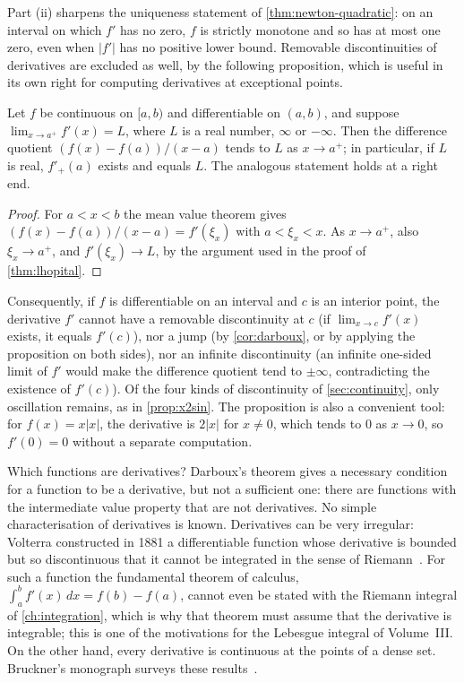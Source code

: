 Part (ii) sharpens the uniqueness statement of \cref{thm:newton-quadratic}: on an interval on which $f'$ has no zero, $f$ is strictly monotone and so has at most one zero, even when $|f'|$ has no positive lower bound. Removable discontinuities of derivatives are excluded as well, by the following proposition, which is useful in its own right for computing derivatives at exceptional points.

\begin{proposition}
\label{prop:derivative-limit}
Let $f$ be continuous on $[a,b)$ and differentiable on $(a,b)$, and suppose $\lim_{x\to a^+}f'(x)=L$, where $L$ is a real number, $\infty$ or $-\infty$. Then the difference quotient $(f(x)-f(a))/(x-a)$ tends to $L$ as $x\to a^+$; in particular, if $L$ is real, $f'_+(a)$ exists and equals $L$. The analogous statement holds at a right end.
\end{proposition}

\begin{proof}
For $a<x<b$ the mean value theorem gives $(f(x)-f(a))/(x-a)=f'(\xi_x)$ with $a<\xi_x<x$. As $x\to a^+$, also $\xi_x\to a^+$, and $f'(\xi_x)\to L$, by the argument used in the proof of \cref{thm:lhopital}.
\end{proof}

Consequently, if $f$ is differentiable on an interval and $c$ is an interior point, the derivative $f'$ cannot have a removable discontinuity at $c$ (if $\lim_{x\to c}f'(x)$ exists, it equals $f'(c)$), nor a jump (by \cref{cor:darboux}, or by applying the proposition on both sides), nor an infinite discontinuity (an infinite one-sided limit of $f'$ would make the difference quotient tend to $\pm\infty$, contradicting the existence of $f'(c)$). Of the four kinds of discontinuity of \cref{sec:continuity}, only oscillation remains, as in \cref{prop:x2sin}. The proposition is also a convenient tool: for $f(x)=x|x|$, the derivative is $2|x|$ for $x\ne0$, which tends to $0$ as $x\to0$, so $f'(0)=0$ without a separate computation.

\begin{note}{Which functions are derivatives?}
Darboux's theorem gives a necessary condition for a function to be a derivative, but not a sufficient one: there are functions with the intermediate value property that are not derivatives. No simple characterisation of derivatives is known. Derivatives can be very irregular: Volterra constructed in 1881 a differentiable function whose derivative is bounded but so discontinuous that it cannot be integrated in the sense of Riemann~\cite{volterra1881}. For such a function the fundamental theorem of calculus, $\int_a^bf'(x)\,dx=f(b)-f(a)$, cannot even be stated with the Riemann integral of \cref{ch:integration}, which is why that theorem must assume that the derivative is integrable; this is one of the motivations for the Lebesgue integral of Volume~III. On the other hand, every derivative is continuous at the points of a dense set. Bruckner's monograph surveys these results~\cite{bruckner1994}.
\end{note}

